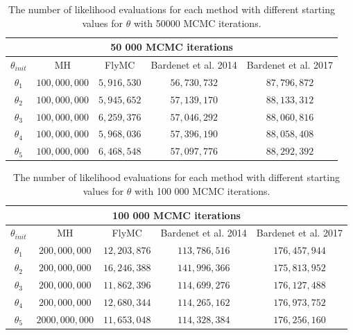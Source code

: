  \begin{table}
    \centering
\begin{tabular}{|c|c|c|c|c|}
  \hline
    \multicolumn{5}{|c|}{50 000 MCMC iterations} \\
    \hline
\hline
        $\theta_{init}$ &  MH & FlyMC & Bardenet et al. 2014 & Bardenet et al. 2017\\ 
         \hline \hline$\theta_1$ & $100,000,000$ & $5,916,530$ & $56,730,732$ & $87,796,872$ \\
        $\theta_2$ & $100,000,000$ & $5,945,652$ & $57,139,170$ & $88,133,312$ \\
        $\theta_3$ & $100,000,000$ & $6,259,376$ & $57,046,292$ & $88,060,816$
        \\ $ \theta_4$ & $100,000,000$ & $5,968,036$ & $57,396,190$ & $88,058,408$ \\
        $\theta_5$ &$100,000,000$&$6,468,548$&$57,097,776$&$88,292,392$
        \\ \hline
\end{tabular}
\caption{The number of likelihood evaluations for each method with different starting values for $\theta$ with 50000 MCMC iterations.}
\label{tab:ll_evals_50k_normal}
\end{table} 

 \begin{table}
    \centering
\begin{tabular}{|c|c|c|c|c|}
  \hline
    \multicolumn{5}{|c|}{100 000 MCMC iterations} \\
    \hline
\hline
        $\theta_{init}$ &  MH & FlyMC & Bardenet et al. 2014 & Bardenet et al. 2017\\ 
         \hline \hline$\theta_1$ & $200,000,000$ & $12,203,876$ & $113,786,516$ & $176,457,944$ \\
        $\theta_2$ & $200,000,000$ & $16,246,388$ & $141,996,366$ & $175,813,952$ \\
        $ \theta_3$ & $200,000,000$ & $11,862,396$ & $114,699,276$ & $176,127,488$ \\
        $\theta_4$ & $200,000,000$ & $12,680,344$ & $114,265,162$ & $176,973,752$ \\
        $\theta_5$ &$2000,000,000$&$11,653,048$&$114,328,384$&$176,256,160$
        \\ \hline
\end{tabular}
\caption{The number of likelihood evaluations for each method with different starting values for $\theta$ with 100 000 MCMC iterations.}
\label{tab:ll_evals_100k_normal}
\end{table} 

